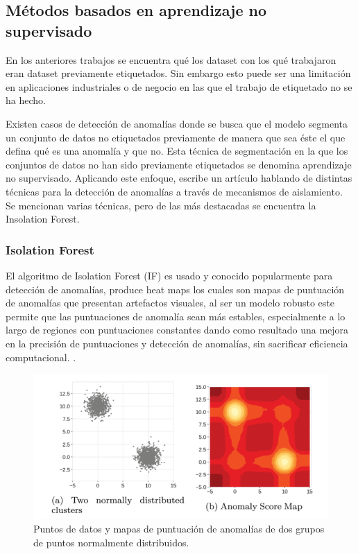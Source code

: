 \documentclass[11pt,a4paper,spanish]{book}
\numberwithin{equation}{chapter}
\numberwithin{figure}{chapter}
\begin{document}
\subsection{Métodos basados en aprendizaje no supervisado}


En los anteriores trabajos se encuentra qué los dataset con los qué trabajaron eran 
dataset previamente etiquetados. Sin embargo esto puede ser una limitación en 
aplicaciones industriales o de negocio en las que el trabajo de etiquetado no se ha 
hecho.


Existen casos de detección de anomalías donde se busca que el modelo segmenta un 
conjunto de datos no etiquetados previamente de manera que sea éste el que defina qué 
es una anomalía y que no. Esta técnica de segmentación en la que los conjuntos de datos 
no han sido previamente etiquetados se denomina aprendizaje no supervisado. Aplicando 
este enfoque,  \cite{Cao_2025} escribe un artículo hablando de distintas técnicas para 
la detección de anomalías a través de mecanismos de aislamiento. Se mencionan varias 
técnicas, pero de las más destacadas se encuentra la Insolation Forest.


\subsubsection{Isolation Forest}

El algoritmo de Isolation Forest (IF) es usado y conocido popularmente para detección de 
anomalías, produce heat maps los cuales son mapas de puntuación de anomalías que 
presentan artefactos visuales, al ser un modelo robusto este permite que las 
puntuaciones de anomalía sean más estables, especialmente a lo largo de regiones con 
puntuaciones constantes dando como resultado una mejora en la precisión de puntuaciones 
y detección de anomalías, sin sacrificar eficiencia computacional. 
\cite{liu2021isoletionforest}.

\begin{figure}[h]
    \centering
    \includegraphics[width=1.0\textwidth]{media/liu-isolation-forest.png}
    \caption{Puntos de datos y mapas de puntuación de anomalías de dos grupos de puntos 
    normalmente distribuidos.  \protect\cite{liu2021isoletionforest} }
    \label{fig:figIsolationForest}
\end{figure}
\end{document}
